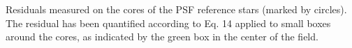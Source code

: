 Residuals measured on the cores of the PSF reference stars (marked by circles). The residual has been quantified according to Eq. 14 applied to small boxes around the cores, as indicated by the green box in the center of the field.
  
  